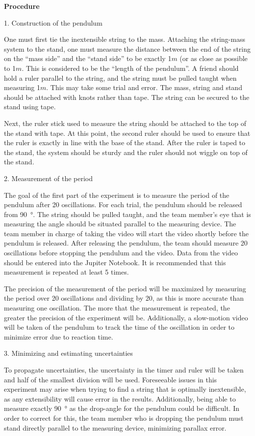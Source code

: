 \textbf{Procedure}

1. Construction of the pendulum

One must first tie the inextensible string to the mass. Attaching the string-mass system to the stand, one must measure the distance between the end of the string on the ``mass side'' and the ``stand side'' to be exactly 1$\si{m}$ (or as close as possible to 1$\si{m}$. This is considered to be the ``length of the pendulum''. A friend should hold a ruler parallel to the string, and the string must be pulled taught when measuring 1$\si{m}$. This may take some trial and error. The mass, string and stand should be attached with knots rather than tape. The string can be secured to the stand using tape.

Next, the ruler stick used to measure the string should be attached to the top of the stand with tape. At this point, the second ruler should be used to ensure that the ruler is exactly in line with the base of the stand. After the ruler is taped to the stand, the system should be sturdy and the ruler should not wiggle on top of the stand.

2. Measurement of the period

The goal of the first part of the experiment is to measure the period of the pendulum after 20 oscillations. For each trial, the pendulum should be released from \SI{90}{\degree}. The string should be pulled taught, and the team member's eye that is measuring the angle should be situated parallel to the measuring device. The team member in charge of taking the video will start the video shortly before the pendulum is released. After releasing the pendulum, the team should measure 20 oscillations before stopping the pendulum and the video. Data from the video should be entered into the Jupiter Notebook. It is recommended that this measurement is repeated at least 5 times.

The precision of the measurement of the period will be maximized by measuring the period over 20 oscillations and dividing by 20, as this is more accurate than measuring one oscillation. The more that the measurement is repeated, the greater the precision of the experiment will be. Additionally, a slow-motion video will be taken of the pendulum to track the time of the oscillation in order to minimize error due to reaction time. 

3. Minimizing and estimating uncertainties

To propagate uncertainties, the uncertainty in the timer and ruler will be taken and half of the smallest division will be used. Foreseeable issues in this experiment may arise when trying to find a string that is optimally inextensible, as any extensibility will cause error in the results. Additionally, being able to measure exactly \SI{90}{\degree} as the drop-angle for the pendulum could be difficult. In order to correct for this, the team member who is dropping the pendulum must stand directly parallel to the measuring device, minimizing parallax error. 

